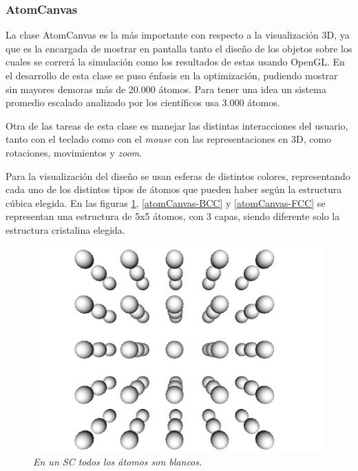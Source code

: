 \subsubsection{AtomCanvas}

La clase AtomCanvas es la más importante con respecto a la visualización 3D, ya que es la encargada de mostrar en pantalla tanto el diseño de los objetos sobre los cuales se correrá la simulación como los resultados de estas usando OpenGL. En el desarrollo de esta clase se puso énfasis en la optimización, pudiendo mostrar sin mayores demoras más de 20.000 átomos. Para tener una idea un sistema promedio escalado analizado por los científicos usa 3.000 átomos.

Otra de las tareas de esta clase es manejar las distintas interacciones del usuario, tanto con el teclado como con el \emph{mouse} con las representaciones en 3D, como rotaciones, movimientos y \emph{zoom}.

Para la visualización del diseño se usan esferas de distintos colores, representando cada uno de los distintos tipos de átomos que pueden haber según la estructura cúbica elegida. En las figuras \ref{atomCanvas-SC}, \ref{atomCanvas-BCC} y \ref{atomCanvas-FCC} se representan una estructura de 5x5 átomos, con 3 capas, siendo diferente solo la estructura cristalina elegida.

\begin{figure}[ht]
  \centering
  \includegraphics[scale=.3]{images/atomCanvas-SC}
  \caption{\em En un SC todos los átomos son blancos.}
  \label{atomCanvas-SC}
\end{figure}

